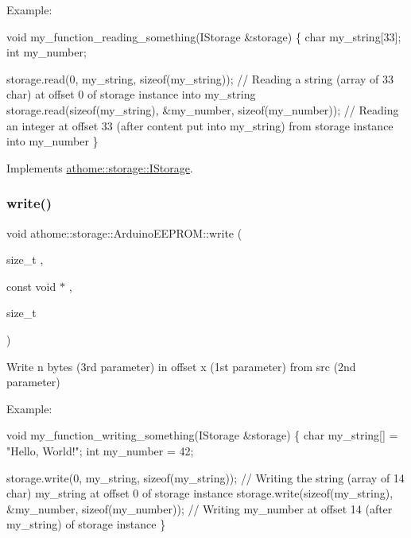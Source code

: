 Example\+:


\begin{DoxyCode}
\textcolor{keywordtype}{void} my\_function\_reading\_something(IStorage &storage) \{
  \textcolor{keywordtype}{char} my\_string[33];
  \textcolor{keywordtype}{int} my\_number;

  storage.read(0, my\_string, \textcolor{keyword}{sizeof}(my\_string)); \textcolor{comment}{// Reading a string (array}
of 33 char) at offset 0 of storage instance into my\_string
  storage.read(\textcolor{keyword}{sizeof}(my\_string), &my\_number, \textcolor{keyword}{sizeof}(my\_number)); \textcolor{comment}{//}
Reading an integer at offset 33 (after content put into my\_string) from
storage instance into my\_number
\}
\end{DoxyCode}
 

Implements \mbox{\hyperlink{classathome_1_1storage_1_1_i_storage_af623393cdf559addf167463ce4e7005e}{athome\+::storage\+::\+I\+Storage}}.

\mbox{\label{classathome_1_1storage_1_1_arduino_e_e_p_r_o_m_a20027ab8a5b20c1fad3e3e42daafe53d}} 
\subsubsection{\texorpdfstring{write()}{write()}}
{\footnotesize\ttfamily void athome\+::storage\+::\+Arduino\+E\+E\+P\+R\+O\+M\+::write (\begin{DoxyParamCaption}\item[{size\+\_\+t}]{,  }\item[{const void $\ast$}]{,  }\item[{size\+\_\+t}]{ }\end{DoxyParamCaption})\hspace{0.3cm}{\ttfamily [virtual]}}

Write n bytes (3rd parameter) in offset x (1st parameter) from src (2nd parameter)

Example\+:


\begin{DoxyCode}
\textcolor{keywordtype}{void} my\_function\_writing\_something(IStorage &storage) \{
  \textcolor{keywordtype}{char} my\_string[] = \textcolor{stringliteral}{"Hello, World!"};
  \textcolor{keywordtype}{int} my\_number = 42;

  storage.write(0, my\_string, \textcolor{keyword}{sizeof}(my\_string)); \textcolor{comment}{// Writing the string}
(array of 14 char) my\_string at offset 0 of storage instance
  storage.write(\textcolor{keyword}{sizeof}(my\_string), &my\_number, \textcolor{keyword}{sizeof}(my\_number)); \textcolor{comment}{//}
Writing my\_number at offset 14 (after my\_string) of storage instance
\}
\end{DoxyCode}
 

